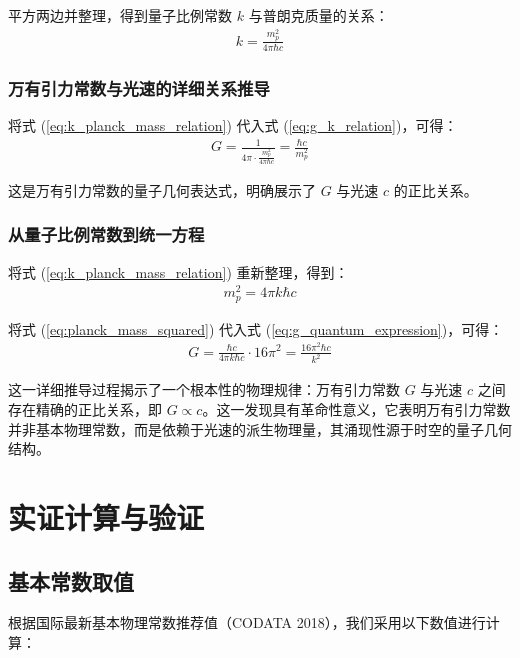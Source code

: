 \documentclass[12pt,twocolumn]{article}
\begin{document}
平方两边并整理，得到量子比例常数 $k$ 与普朗克质量的关系：
\begin{align}
    k = \frac{m_p^2}{4\pi \hbar c}
    \label{eq:k_planck_mass_relation}
\end{align}

\subsubsection{万有引力常数与光速的详细关系推导}

将式 (\ref{eq:k_planck_mass_relation}) 代入式 (\ref{eq:g_k_relation})，可得：
\begin{align}
    G = \frac{1}{4\pi \cdot \frac{m_p^2}{4\pi \hbar c}} = \frac{\hbar c}{m_p^2}
    \label{eq:g_quantum_expression}
\end{align}

这是万有引力常数的量子几何表达式，明确展示了 $G$ 与光速 $c$ 的正比关系。

\subsubsection{从量子比例常数到统一方程}

将式 (\ref{eq:k_planck_mass_relation}) 重新整理，得到：
\begin{align}
    m_p^2 = 4\pi k \hbar c
    \label{eq:planck_mass_squared}
\end{align}

将式 (\ref{eq:planck_mass_squared}) 代入式 (\ref{eq:g_quantum_expression})，可得：
\begin{align}
    G = \frac{\hbar c}{4\pi k \hbar c} \cdot 16\pi^2 = \frac{16\pi^2 \hbar c}{k^2}
    \label{eq:g_unified_equation}
\end{align}

这一详细推导过程揭示了一个根本性的物理规律：万有引力常数 $G$ 与光速 $c$ 之间存在精确的正比关系，即 $G \propto c$。这一发现具有革命性意义，它表明万有引力常数并非基本物理常数，而是依赖于光速的派生物理量，其涌现性源于时空的量子几何结构。

\section{实证计算与验证}

\subsection{基本常数取值}

根据国际最新基本物理常数推荐值（CODATA 2018\cite{joyce2016}），我们采用以下数值进行计算：
\end{document}
